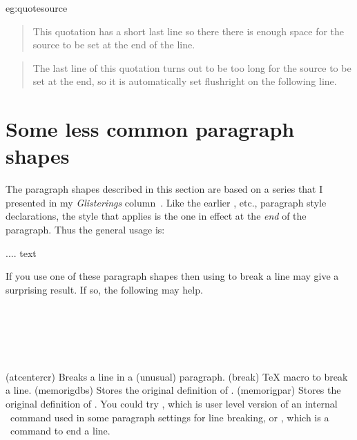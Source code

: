 \begin{egsource}{eg:quotesource}
\begin{quotation}
This quotation has a short last line so there there is enough space 
for the source to be set at
the end of the line.
\end{quotation}

\begin{quotation}
The last line of this quotation turns out to be too long for
the source to be set at the end, so it is automatically
set flushright on the following line.
\end{quotation}
\end{egsource}

\section{Some less common paragraph shapes}

    The paragraph shapes described in this section are based on a series
that I presented in my \emph{Glisterings} column~\cite{GLISTER07,GLISTER08}.
Like the earlier \cmd{\centering}, etc., paragraph style declarations, the
style that applies is the one in effect at the \emph{end} of the paragraph.
Thus the general usage is:
\begin{lcode}
\bgroup%
\paragraphstyle
.... text
\par%
\egroup%
\end{lcode}

    If you use one of these paragraph shapes then using \cmd{\\} to break
a line may give a surprising result. If so, the following may help.
\begin{syntax}
\cmd{\atcentercr} \\
\cmd{\break} \\
\cmd{\memorigdbs} \\
\cmd{\memorigpar} \\
\end{syntax}
\glossary(atcentercr)%
  {}%
  {Breaks a line in a (unusual) paragraph.}
\glossary(break)%
  {}%
  {TeX macro to break a line.}
\glossary(memorigdbs)%
  {}%
  {Stores the original definition of \texttt{\bs}\texttt{\bs}.} %
\glossary(memorigpar)%
  {}%
  {Stores the original definition of %
  .}
You could try \cmd{\atcentcr}, which is user level version of an internal
\ltx\ command used in some paragraph settings for line breaking, 
or \cmd{\break}, which is a \tx\ command to end a line.

